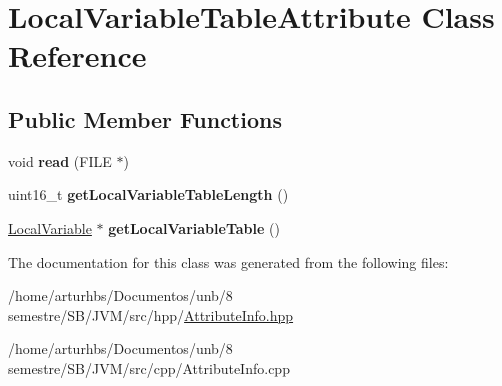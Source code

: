 \hypertarget{classLocalVariableTableAttribute}{}\section{Local\+Variable\+Table\+Attribute Class Reference}
\label{classLocalVariableTableAttribute}
\subsection*{Public Member Functions}
\begin{DoxyCompactItemize}
\item 
void {\bfseries read} (F\+I\+LE $\ast$)\hypertarget{classLocalVariableTableAttribute_a1c9144f74ddf8329deff7e2ffa05541a}{}\label{classLocalVariableTableAttribute_a1c9144f74ddf8329deff7e2ffa05541a}

\item 
uint16\+\_\+t {\bfseries get\+Local\+Variable\+Table\+Length} ()\hypertarget{classLocalVariableTableAttribute_aa140edc8a31d1d105b5430af9c1d5d26}{}\label{classLocalVariableTableAttribute_aa140edc8a31d1d105b5430af9c1d5d26}

\item 
\hyperlink{classLocalVariable}{Local\+Variable} $\ast$ {\bfseries get\+Local\+Variable\+Table} ()\hypertarget{classLocalVariableTableAttribute_a0fc8c4b5571871e61bee2bf4b0dc05a1}{}\label{classLocalVariableTableAttribute_a0fc8c4b5571871e61bee2bf4b0dc05a1}

\end{DoxyCompactItemize}


The documentation for this class was generated from the following files\+:\begin{DoxyCompactItemize}
\item 
/home/arturhbs/\+Documentos/unb/8 semestre/\+S\+B/\+J\+V\+M/src/hpp/\hyperlink{AttributeInfo_8hpp}{Attribute\+Info.\+hpp}\item 
/home/arturhbs/\+Documentos/unb/8 semestre/\+S\+B/\+J\+V\+M/src/cpp/Attribute\+Info.\+cpp\end{DoxyCompactItemize}
